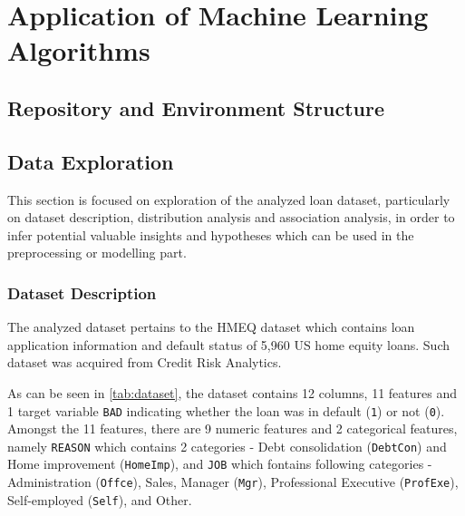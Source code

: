 \chapter{Application of Machine Learning Algorithms}
\label{chap:four}

\section{Repository and Environment Structure}
\section{Data Exploration}
This section is focused on exploration of the analyzed loan dataset, particularly on dataset description, distribution analysis and association analysis, in order to infer potential valuable insights and hypotheses which can be used in the preprocessing or modelling part.

\subsection{Dataset Description}
The analyzed dataset pertains to the HMEQ dataset which contains loan application information and default status of 5,960 US home equity loans. Such dataset was acquired from Credit Risk Analytics.

As can be seen in \autoref{tab:dataset}, the dataset contains 12 columns, 11 features and 1 target variable \texttt{BAD} indicating whether the loan was in default (\texttt{1}) or not (\texttt{0}). 
Amongst the 11 features, there are 9 numeric features and 2 categorical features, namely \texttt{REASON} which contains 2 categories - Debt consolidation (\texttt{DebtCon}) and Home improvement (\texttt{HomeImp}), and \texttt{JOB} which fontains following categories - Administration (\texttt{Offce}), Sales, Manager (\texttt{Mgr}), Professional Executive (\texttt{ProfExe}), Self-employed (\texttt{Self}), and Other.


